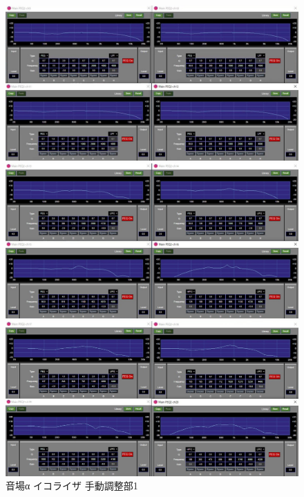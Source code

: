 \documentclass[11pt,a4j]{jreport}
\begin{document}
\begin{figure}[H]
  \begin{minipage}[b]{.5\linewidth}
    \centering
    \includegraphics[width=.9\linewidth]{images/experimentField/afcParameters/01alpha/04manualEQ3.jpg}
  \end{minipage}%
  \begin{minipage}[b]{.5\linewidth}
    \centering
    \includegraphics[width=.9\linewidth]{images/experimentField/afcParameters/01alpha/04manualEQ4.jpg}
  \end{minipage}

  \begin{minipage}[b]{1\linewidth}
    \centering
    \includegraphics[width=.45\linewidth]{images/experimentField/afcParameters/01alpha/04manualEQ5.jpg}
  \end{minipage}

  \centering
  \caption{音場α イコライザ 手動調整部1}
  \label{fig:alphaイコライザ手動調整部1}
\end{figure}
\end{document}
